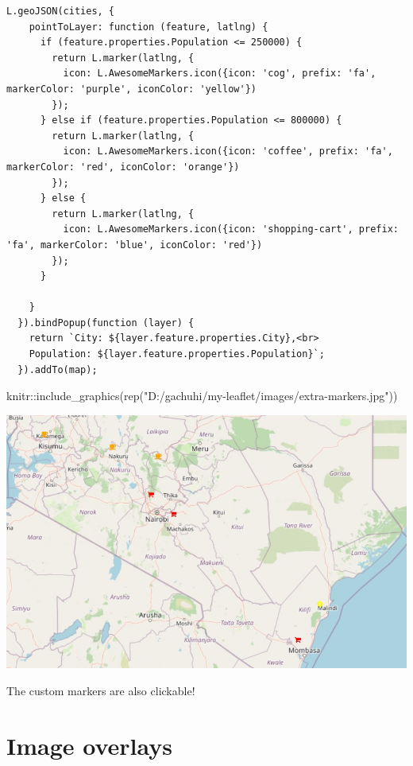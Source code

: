 \documentclass[
]{book}
\newenvironment{Shaded}{\begin{snugshade}}{\end{snugshade}}
\newcommand{\FunctionTok}[1]{\textcolor[rgb]{0.00,0.00,0.00}{#1}}
\newcommand{\NormalTok}[1]{#1}
\newcommand{\SpecialCharTok}[1]{\textcolor[rgb]{0.00,0.00,0.00}{#1}}
\newcommand{\StringTok}[1]{\textcolor[rgb]{0.31,0.60,0.02}{#1}}
\begin{document}
\begin{verbatim}
L.geoJSON(cities, {
    pointToLayer: function (feature, latlng) {
      if (feature.properties.Population <= 250000) {
        return L.marker(latlng, {
          icon: L.AwesomeMarkers.icon({icon: 'cog', prefix: 'fa', markerColor: 'purple', iconColor: 'yellow'}) 
        });
      } else if (feature.properties.Population <= 800000) {
        return L.marker(latlng, {
          icon: L.AwesomeMarkers.icon({icon: 'coffee', prefix: 'fa', markerColor: 'red', iconColor: 'orange'}) 
        });
      } else {
        return L.marker(latlng, {
          icon: L.AwesomeMarkers.icon({icon: 'shopping-cart', prefix: 'fa', markerColor: 'blue', iconColor: 'red'})
        });
      }
      
    }
  }).bindPopup(function (layer) {
    return `City: ${layer.feature.properties.City},<br>
    Population: ${layer.feature.properties.Population}`;
  }).addTo(map);
\end{verbatim}

\begin{Shaded}
\begin{Highlighting}[]
\NormalTok{knitr}\SpecialCharTok{::}\FunctionTok{include\_graphics}\NormalTok{(}\FunctionTok{rep}\NormalTok{(}\StringTok{"D:/gachuhi/my{-}leaflet/images/extra{-}markers.jpg"}\NormalTok{))}
\end{Highlighting}
\end{Shaded}

\includegraphics[width=12.25in]{../images/extra-markers}

The custom markers are also clickable!

\hypertarget{image-overlays}{%
\section{Image overlays}\label{image-overlays}}
\end{document}

